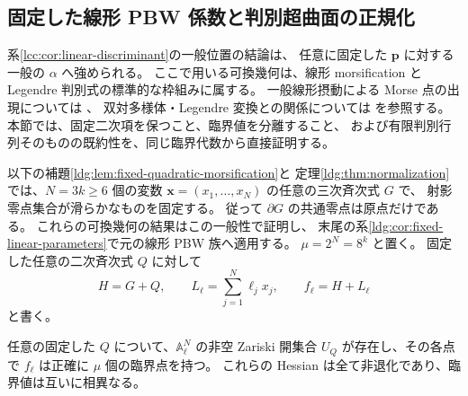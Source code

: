 \subsection{固定した線形 PBW 係数と判別超曲面の正規化}
\label{ldg:subsec:discriminant-geometry}

系\ref{lcc:cor:linear-discriminant}の一般位置の結論は、
任意に固定した $\mathbf p$ に対する一般の $\alpha$ へ強められる。
ここで用いる可換幾何は、線形 morsification と Legendre 判別式の標準的な枠組みに属する。
一般線形摂動による Morse 点の出現については
\cite[Theorem~2.5 and its proof]{CMOMaximTibarMorse}、
双対多様体・Legendre 変換との関係については
\cite[Section~1.2, Theorem~1.7, Section~1.3.B]{CMOTevelevDuality}を参照する。
本節では、固定二次項を保つこと、臨界値を分離すること、
および有限判別行列そのものの既約性を、同じ臨界代数から直接証明する。

以下の補題\ref{ldg:lem:fixed-quadratic-morsification}と
定理\ref{ldg:thm:normalization}では、$N=3k\ge6$ 個の変数
$\mathbf x=(x_1,\ldots,x_N)$ の任意の三次斉次式 $G$ で、
射影零点集合が滑らかなものを固定する。
従って $\partial G$ の共通零点は原点だけである。
これらの可換幾何の結果はこの一般性で証明し、
末尾の系\ref{ldg:cor:fixed-linear-parameters}で元の線形 PBW 族へ適用する。
$\mu=2^N=8^k$ と置く。
固定した任意の二次斉次式 $Q$ に対して
\[
 H=G+Q,\qquad L_\ell=\sum_{j=1}^N\ell_jx_j,\qquad
 f_\ell=H+L_\ell
\]
と書く。

\begin{lemma}[固定二次項に対する一般線形摂動]
\label{ldg:lem:fixed-quadratic-morsification}
任意の固定した $Q$ について、$\mathbb A^N_\ell$ の非空 Zariski 開集合
$U_Q$ が存在し、その各点で $f_\ell$ は正確に $\mu$ 個の臨界点を持つ。
これらの Hessian は全て非退化であり、臨界値は互いに相異なる。
\end{lemma}

